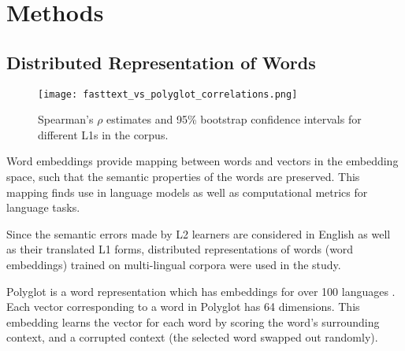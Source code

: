 \documentclass[10pt,letterpaper]{article}
\begin{document}
\section{Methods}

\subsection{Distributed Representation of Words}

\begin{figure*}[t]
    \centering
        \texttt{[image: fasttext\_vs\_polyglot\_correlations.png]}
        \caption{Spearman's $\rho$ estimates and 95\% bootstrap confidence intervals for different L1s in the corpus.}
        \label{fig:boot}
\end{figure*}
\raggedbottom



Word embeddings provide mapping between words and vectors in the embedding space, such that the semantic properties of the words are preserved. This mapping finds use in language models as well as computational metrics for language tasks. 

Since the semantic errors made by L2 learners are considered in English as well as their translated L1 forms, distributed representations of words (word embeddings) trained on multi-lingual corpora were used in the study.




Polyglot is a word representation which has embeddings for over 100 languages \cite{al-rfouPolyglotDistributedWord2013}. Each vector corresponding to a word in Polyglot has 64 dimensions. This embedding learns the vector for each word by scoring the word's surrounding context, and a corrupted context (the selected word swapped out randomly). 
\end{document}
